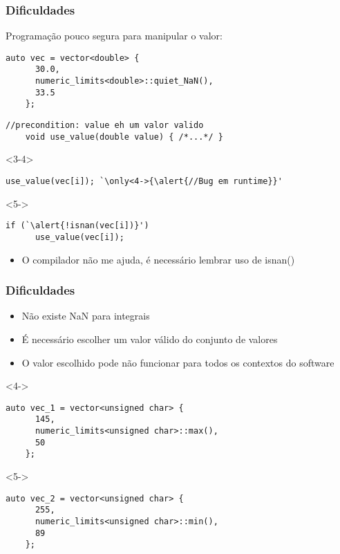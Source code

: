 \documentclass[t]{beamer}
\begin{document}
\begin{frame}[fragile]
  \frametitle{Dificuldades}
  Programação pouco segura para manipular o valor:
  \begin{lstlisting}[escapeinside=`']
    auto vec = vector<double> {
      30.0,
      numeric_limits<double>::quiet_NaN(),
      33.5
    };
  \end{lstlisting}

  \pause
    
  \begin{lstlisting}[escapeinside=`']
    //precondition: value eh um valor valido
    void use_value(double value) { /*...*/ }
  \end{lstlisting}

  \pause

  \begin{onlyenv}<3-4>
  \begin{lstlisting}[escapeinside=`']
    use_value(vec[i]); `\only<4->{\alert{//Bug em runtime}}'
  \end{lstlisting}
  \end{onlyenv}

  \begin{onlyenv}<5->
  \begin{lstlisting}[escapeinside=`']
    if (`\alert{!isnan(vec[i])}')
      use_value(vec[i]);
  \end{lstlisting}
  \end{onlyenv}

  \begin{itemize}
  \item<6->{O compilador não me ajuda, é necessário lembrar uso de isnan()}
  \end{itemize}
\end{frame}

\begin{frame}[fragile]
  \frametitle{Dificuldades}
  \begin{itemize}
    \item<1->{Não existe NaN para integrais}
    \item<2->{É necessário escolher um valor válido do conjunto de valores}
    \item<3->{O valor escolhido pode não funcionar para todos os contextos do software}
  \end{itemize}

  \begin{visibleenv}<4->
  \begin{lstlisting}[escapeinside=`']
    auto vec_1 = vector<unsigned char> {
      145,
      numeric_limits<unsigned char>::max(),
      50
    };
  \end{lstlisting}
  \end{visibleenv}

  \begin{visibleenv}<5->
  \begin{lstlisting}[escapeinside=`']
    auto vec_2 = vector<unsigned char> {
      255,
      numeric_limits<unsigned char>::min(),
      89
    };
  \end{lstlisting}
  \end{visibleenv}
\end{frame}
\end{document}
